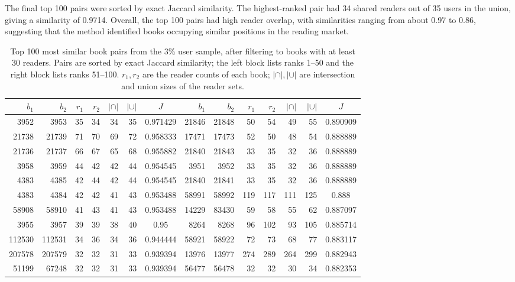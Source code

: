 \documentclass[10pt,twocolumn]{article}
\begin{document}
The final top 100 pairs were sorted by exact Jaccard similarity. The highest-ranked pair had 34 shared readers out of 35 users in the union, giving a similarity of 0.9714. Overall, the top 100 pairs had high reader overlap, with similarities ranging from about 0.97 to 0.86, suggesting that the method identified books occupying similar positions in the reading market.

\begin{table}[t]
\centering
\fontsize{7.5}{8.0}\selectfont
\setlength{\tabcolsep}{1.5pt}
\caption{Top 100 most similar book pairs from the 3\% user sample, after filtering to books with at least 30 readers. Pairs are sorted by exact Jaccard similarity; the left block lists ranks 1--50 and the right block lists ranks 51--100. $r_1, r_2$ are the reader counts of each book; $|\cap|, |\cup|$ are intersection and union sizes of the reader sets.}
\label{tab:minhash}
\begin{tabular}{rrrrrrc@{\hspace{1em}}rrrrrrc}
\toprule
$b_1$ & $b_2$ & $r_1$ & $r_2$ & $|\cap|$ & $|\cup|$ & $J$ & $b_1$ & $b_2$ & $r_1$ & $r_2$ & $|\cap|$ & $|\cup|$ & $J$ \\
\midrule
3952 & 3953 & 35 & 34 & 34 & 35 & 0.971429 & 21846 & 21848 & 50 & 54 & 49 & 55 & 0.890909 \\
21738 & 21739 & 71 & 70 & 69 & 72 & 0.958333 & 17471 & 17473 & 52 & 50 & 48 & 54 & 0.888889 \\
21736 & 21737 & 66 & 67 & 65 & 68 & 0.955882 & 21840 & 21843 & 33 & 35 & 32 & 36 & 0.888889 \\
3958 & 3959 & 44 & 42 & 42 & 44 & 0.954545 & 3951 & 3952 & 33 & 35 & 32 & 36 & 0.888889 \\
4383 & 4385 & 42 & 44 & 42 & 44 & 0.954545 & 21840 & 21841 & 33 & 35 & 32 & 36 & 0.888889 \\
4383 & 4384 & 42 & 42 & 41 & 43 & 0.953488 & 58991 & 58992 & 119 & 117 & 111 & 125 & 0.888 \\
58908 & 58910 & 41 & 43 & 41 & 43 & 0.953488 & 14229 & 83430 & 59 & 58 & 55 & 62 & 0.887097 \\
3955 & 3957 & 39 & 39 & 38 & 40 & 0.95 & 8264 & 8268 & 96 & 102 & 93 & 105 & 0.885714 \\
112530 & 112531 & 34 & 36 & 34 & 36 & 0.944444 & 58921 & 58922 & 72 & 73 & 68 & 77 & 0.883117 \\
207578 & 207579 & 32 & 32 & 31 & 33 & 0.939394 & 13976 & 13977 & 274 & 289 & 264 & 299 & 0.882943 \\
51199 & 67248 & 32 & 32 & 31 & 33 & 0.939394 & 56477 & 56478 & 32 & 32 & 30 & 34 & 0.882353 \\

\end{tabular}
\end{table}
\end{document}

